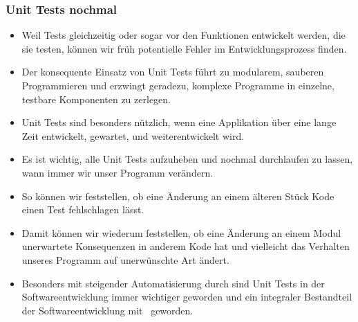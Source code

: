\documentclass[aspectratio=169,mathserif,notheorems]{beamer}%
\begin{document}
%
\begin{frame}[t]%
\frametitle{Unit Tests nochmal}%
\begin{itemize}%
%
\item<2-> Weil Tests gleichzeitig oder sogar vor den Funktionen entwickelt werden, die sie testen, können wir früh potentielle Fehler im Entwicklungsprozess finden.%
\item<3-> Der konsequente Einsatz von Unit Tests führt zu modularem, sauberen Programmieren und erzwingt geradezu, komplexe Programme in einzelne, testbare Komponenten zu zerlegen.%
%
\item<4-> Unit Tests sind besonders nützlich, wenn eine Applikation über eine lange Zeit entwickelt, gewartet, und weiterentwickelt wird.%
%
\item<5-> Es ist wichtig, alle Unit Tests aufzuheben und nochmal durchlaufen zu lassen, wann immer wir unser Programm verändern.%
%
\item<6-> So können wir feststellen, ob eine Änderung an einem älteren Stück Kode einen Test fehlschlagen lässt.%
%
\item<7-> Damit können wir wiederum feststellen, ob eine Änderung an einem Modul unerwartete Konsequenzen in anderem Kode hat und vielleicht das Verhalten unseres Programm auf unerwünschte Art ändert.%
%
\item<8-> Besonders mit steigender Automatisierung durch  sind Unit Tests in der Softwareentwicklung immer wichtiger geworden und ein integraler Bestandteil der Softwareentwicklung mit \python\ geworden.%
\end{itemize}%
\end{frame}%
%
\end{document}
